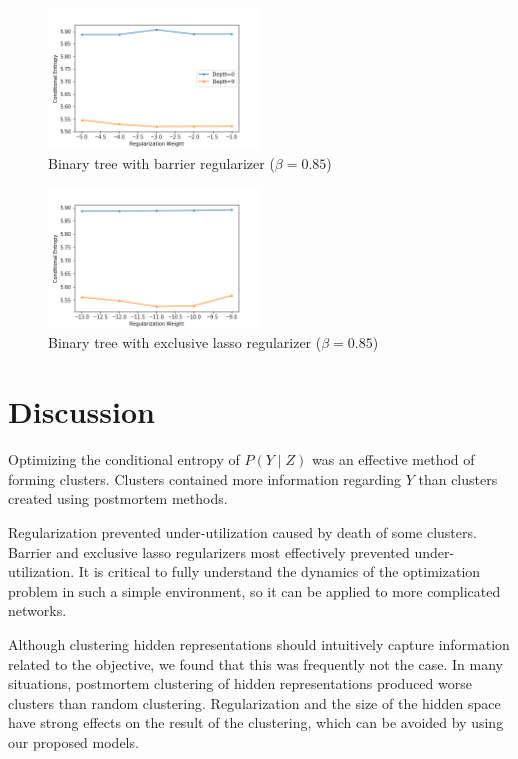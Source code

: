 \documentclass[11pt,letterpaper]{article}
\begin{document}
\begin{figure}
  \caption{Binary tree with barrier regularizer ($\beta=0.85$)}
\label{f:btb}
  \centering
    \includegraphics[width=0.5\textwidth]{skipgram_tree_b_0.png}
\end{figure}
\begin{figure}
  \caption{Binary tree with exclusive lasso regularizer ($\beta=0.85$)}
\label{f:btel}
  \centering
    \includegraphics[width=0.5\textwidth]{skipgram_tree_el_0.png}
\end{figure}

\section{Discussion}

Optimizing the conditional entropy of $P(Y\mid Z)$ was an effective method of forming clusters. Clusters contained more information regarding $Y$ than clusters created using postmortem methods.

Regularization prevented under-utilization caused by death of some clusters. Barrier and exclusive lasso regularizers most effectively prevented under-utilization. It is critical to fully understand the dynamics of the optimization problem in such a simple environment, so it can be applied to more complicated networks.

Although clustering hidden representations should intuitively capture information related to the objective, we found that this was frequently not the case. In many situations, postmortem clustering of hidden representations produced worse clusters than random clustering. Regularization and the size of the hidden space have strong effects on the result of the clustering, which can be avoided by using our proposed models.
\end{document}
